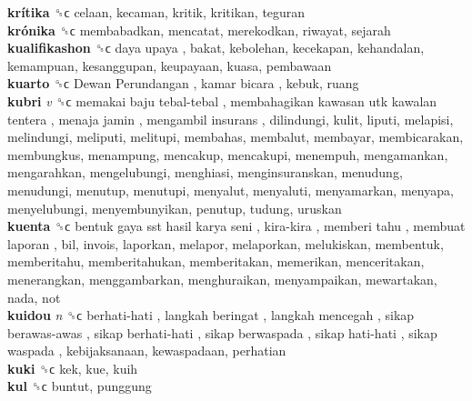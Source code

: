 \textbf{krítika} ␝ϲ  celaan, kecaman, kritik, kritikan, teguran  \\
\textbf{krónika} ␝ϲ  membabadkan, mencatat, merekodkan, riwayat, sejarah  \\
\textbf{kualifikashon} ␝ϲ   daya upaya , bakat, kebolehan, kecekapan, kehandalan, kemampuan, kesanggupan, keupayaan, kuasa, pembawaan  \\
\textbf{kuarto} ␝ϲ   Dewan Perundangan ,  kamar bicara , kebuk, ruang  \\
\textbf{kubri} \emph{v}  ␝ϲ   memakai baju tebal-tebal ,  membahagikan kawasan utk kawalan tentera ,  menaja jamin ,  mengambil insurans , dilindungi, kulit, liputi, melapisi, melindungi, meliputi, melitupi, membahas, membalut, membayar, membicarakan, membungkus, menampung, mencakup, mencakupi, menempuh, mengamankan, mengarahkan, mengelubungi, menghiasi, menginsuranskan, menudung, menudungi, menutup, menutupi, menyalut, menyaluti, menyamarkan, menyapa, menyelubungi, menyembunyikan, penutup, tudung, uruskan  \\
\textbf{kuenta} ␝ϲ   bentuk gaya sst hasil karya seni ,  kira-kira ,  memberi tahu ,  membuat laporan , bil, invois, laporkan, melapor, melaporkan, melukiskan, membentuk, memberitahu, memberitahukan, memberitakan, memerikan, menceritakan, menerangkan, menggambarkan, menghuraikan, menyampaikan, mewartakan, nada, not  \\
\textbf{kuidou} \emph{n}  ␝ϲ   berhati-hati ,  langkah beringat ,  langkah mencegah ,  sikap berawas-awas ,  sikap berhati-hati ,  sikap berwaspada ,  sikap hati-hati ,  sikap waspada , kebijaksanaan, kewaspadaan, perhatian  \\
\textbf{kuki} ␝ϲ  kek, kue, kuih  \\
\textbf{kul} ␝ϲ  buntut, punggung  \\
